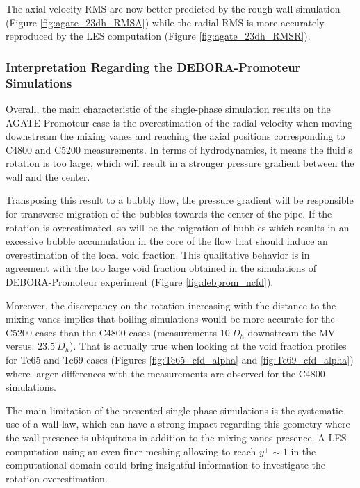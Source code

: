 \npar

The axial velocity RMS are now better predicted by the rough wall simulation (Figure \ref{fig:agate_23dh_RMSA}) while the radial RMS is more accurately reproduced by the LES computation (Figure \ref{fig:agate_23dh_RMSR}). 

\subsubsection{Interpretation Regarding the DEBORA-Promoteur Simulations}

Overall, the main characteristic of the single-phase simulation results on the AGATE-Promoteur case is the overestimation of the radial velocity when moving downstream the mixing vanes and reaching the axial positions corresponding to C4800 and C5200 measurements. In terms of hydrodynamics, it means the fluid's rotation is too large, which will result in a stronger pressure gradient between the wall and the center. 

\npar

Transposing this result to a bubbly flow, the pressure gradient will be responsible for transverse migration of the bubbles towards the center of the pipe. If the rotation is overestimated, so will be the migration of bubbles which results in an excessive bubble accumulation in the core of the flow that should induce an overestimation of the local void fraction. This qualitative behavior is in agreement with the too large void fraction obtained in the simulations of DEBORA-Promoteur experiment (Figure \ref{fig:debprom_ncfd}).

\npar

Moreover, the discrepancy on the rotation increasing with the distance to the mixing vanes implies that boiling simulations would be more accurate for the C5200 cases than the C4800 cases (measurements $10\ D_{h}$ downstream the MV versus. $23.5\ D_{h}$). That is actually true when looking at the void fraction profiles for Te65 and Te69 cases (Figures \ref{fig:Te65_cfd_alpha} and \ref{fig:Te69_cfd_alpha}) where larger differences with the measurements are observed for the C4800 simulations.



\begin{remark*}{}
The main limitation of the presented single-phase simulations is the systematic use of a wall-law, which can have a strong impact regarding this geometry where the wall presence is ubiquitous in addition to the mixing vanes presence. A LES computation using an even finer meshing allowing to reach $y^{+} \sim 1$ in the computational domain could bring insightful information to investigate the rotation overestimation.
\end{remark*}

